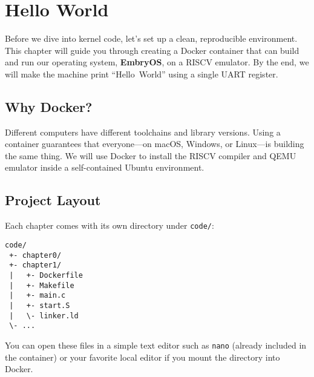 \chapter{Hello World}

Before we dive into kernel code, let's set up a clean, reproducible environment.
This chapter will guide you through creating a Docker container that can build
and run our operating system, \textbf{EmbryOS}, on a RISC\textendash V
emulator.  By the end, we will make the machine print ``Hello~World'' using a
single UART register.

\section{Why Docker?}

Different computers have different toolchains and library versions.  Using a
container guarantees that everyone---on macOS, Windows, or Linux---is building
the same thing.  We will use Docker to install the RISC\textendash V compiler
and QEMU emulator inside a self-contained Ubuntu environment.

\section{Project Layout}

Each chapter comes with its own directory under \texttt{code/}:

\begin{verbatim}
code/
 +- chapter0/
 +- chapter1/
 |   +- Dockerfile
 |   +- Makefile
 |   +- main.c
 |   +- start.S
 |   \- linker.ld
 \- ...
\end{verbatim}

You can open these files in a simple text editor such as \texttt{nano} (already
included in the container) or your favorite local editor if you mount the
directory into Docker.






